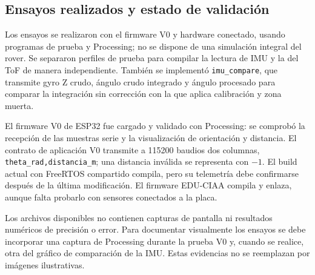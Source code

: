 \documentclass[11pt,a4paper]{article}
\begin{document}
\subsection{Ensayos realizados y estado de validación}

Los ensayos se realizaron con el firmware V0 y hardware conectado, usando
programas de prueba y Processing; no se dispone de una simulación integral del
rover. Se separaron perfiles de prueba para compilar la lectura de IMU y la del
ToF de manera independiente. También se implementó \texttt{imu\_compare}, que
transmite gyro Z crudo, ángulo crudo integrado y ángulo procesado para comparar
la integración sin corrección con la que aplica calibración y zona muerta.

El firmware V0 de ESP32 fue cargado y validado con Processing: se comprobó la
recepción de las muestras serie y la visualización de orientación y distancia.
El contrato de aplicación V0 transmite a 115200 baudios dos columnas,
\texttt{theta\_rad,distancia\_m}; una distancia inválida se representa con
$-1$. El build actual con FreeRTOS compartido compila, pero su telemetría debe
confirmarse después de la última modificación. El firmware EDU-CIAA compila y
enlaza, aunque falta probarlo con sensores conectados a la placa.

Los archivos disponibles no contienen capturas de pantalla ni resultados
numéricos de precisión o error. Para documentar visualmente los ensayos se debe
incorporar una captura de Processing durante la prueba V0 y, cuando se realice,
otra del gráfico de comparación de la IMU. Estas evidencias no se reemplazan
por imágenes ilustrativas.
\end{document}
